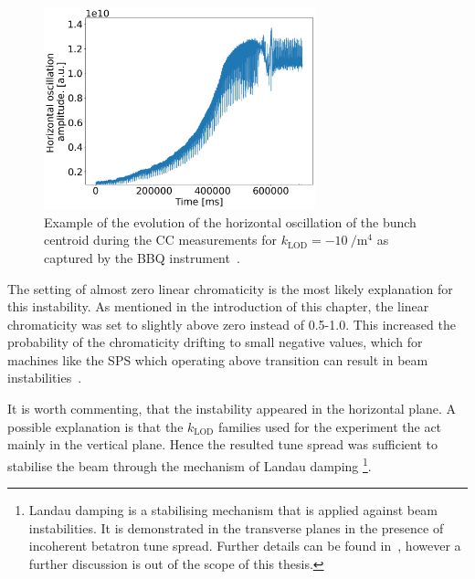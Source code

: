 \begin{figure}[!h]
   \centering         
   \includegraphics[width=0.7\textwidth]{images/Ch8/2022.05.16.17.49.04.430450.png}
       \caption{Example of the evolution of the horizontal oscillation of the bunch centroid during the CC measurements for $k_\mathrm{LOD}=-10 \ \mathrm{/m^4}$ as captured by the BBQ instrument~\cite{Boccardi:1055568}.}
       \label{fig:instability_BBQ_klod-15_4may2022}
\end{figure}


The setting of almost zero linear chromaticity is the most likely explanation for this instability. As mentioned in the introduction of this chapter, the linear chromaticity was set to slightly above zero instead of 0.5-1.0.%
 This increased the probability of the chromaticity drifting to small negative values, which for machines like the SPS which operating above transition can result in beam instabilities~\cite{collective_effects_cas_li}.


It is worth commenting, that the instability appeared in the horizontal plane. A possible explanation is that the $k_\mathrm{LOD}$ families used for the experiment the act mainly in the vertical plane. Hence the resulted tune spread was sufficient to stabilise the beam through the mechanism of Landau damping \footnote{Landau damping is a stabilising mechanism that is applied against beam instabilities. It is demonstrated in the transverse planes in the presence of incoherent betatron tune spread. Further details can be found in~\cite{Herr:1982428, Schenk:2665819}, however a further discussion is out of the scope of this thesis.}.


